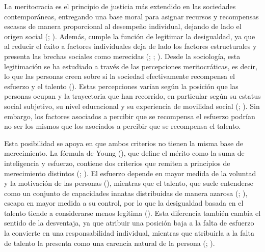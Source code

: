 \documentclass[
  spanish,
  a4paper,
  oneside]{scrbook}
\begin{document}
La meritocracia es el principio de justicia más extendido en las
sociedades contemporáneas, entregando una base moral para asignar
recursos y recompensas escasas de manera proporcional al desempeño
individual, dejando de lado el origen social
(;
). Además,
cumple la función de legitimar la desigualdad, ya que al reducir el
éxito a factores individuales deja de lado los factores estructurales y
presenta las brechas sociales como merecidas
(;
;
). Desde
la sociología, esta legitimación se ha estudiado a través de las
percepciones meritocráticas, es decir, lo que las personas creen sobre
si la sociedad efectivamente recompensa el esfuerzo y el talento
().
Estas percepciones varían según la posición que las personas ocupan y la
trayectoria que han recorrido, en particular según su estatus social
subjetivo, su nivel educacional y su experiencia de movilidad social
(; ). Sin embargo,
los factores asociados a percibir que se recompensa el esfuerzo podrían
no ser los mismos que los asociados a percibir que se recompensa el
talento.

Esta posibilidad se apoya en que ambos criterios no tienen la misma base
de merecimiento. La fórmula de Young (),
que define el mérito como la suma de inteligencia y esfuerzo, contiene
dos criterios que remiten a principios de merecimiento distintos
(;
). El esfuerzo depende en
mayor medida de la voluntad y la motivación de las personas
(),
mientras que el talento, que suele entenderse como un conjunto de
capacidades innatas distribuidas de manera azarosa
(;
), escapa
en mayor medida a su control, por lo que la desigualdad basada en el
talento tiende a considerarse menos legítima
(). Esta
diferencia también cambia el sentido de la desventaja, ya que atribuir
una posición baja a la falta de esfuerzo la convierte en una
responsabilidad individual, mientras que atribuirla a la falta de
talento la presenta como una carencia natural de la persona
(;
).
\end{document}

